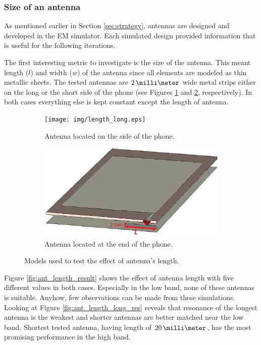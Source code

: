\subsubsection{Size of an antenna}
\label{sec:antenna_size}
As mentioned earlier in Section \ref{sec:strategy}, antennas are designed and developed in the EM simulator. Each simulated design provided information that is useful for the following iterations. 

The first interesting metric to investigate is the size of the antenna. This meant length ($l$) and width ($w$) of the antenna since all elements are modeled as thin metallic sheets. The tested antennas are $2\,\milli\meter$ wide metal strips either on the long or the short side of the phone (see Figures \ref{fig:ant_length_long} and \ref{fig:ant_length_short}, respectively). In both cases everything else is kept constant except the length of antenna. 

\begin{figure}[H]
    \centering
    \begin{subfigure}[b]{0.49\textwidth}
        \texttt{[image: img/length\_long.eps]}
        \caption{Antenna located on the side of the phone.}
        \label{fig:ant_length_long}
    \end{subfigure}
    
    \begin{subfigure}[b]{0.49\textwidth}
        \includegraphics[width=\textwidth]{img/length_short.eps}
        \caption{Antenna located at the end of the phone.}
        \label{fig:ant_length_short}
    \end{subfigure}
    \caption{Models used to test the effect of antenna's length.}
    \label{fig:ant_length_model}
\end{figure}

Figure \ref{fig:ant_length_result} shows the effect of antenna length with five different values in both cases. Especially in the low band, none of these antennas is suitable. Anyhow, few observations can be made from these simulations. Looking at Figure \ref{fig:ant_length_long_res} reveals that resonance of the longest antenna is the weakest and shorter antennas are better matched near the low band. Shortest tested antenna, having length of $20\,\milli\meter$, has the most promising performance in the high band.

